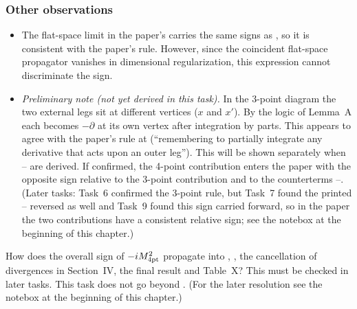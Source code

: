 \subsubsection{Other observations}
\begin{itemize}
\item The flat-space limit in the paper's  carries the same signs as , so
it is consistent with the paper's rule. However, since the coincident flat-space
propagator vanishes in dimensional regularization, this expression cannot discriminate
the sign.
\item \emph{Preliminary note (not yet derived in this task).} In the 3-point diagram the two
external legs sit at different vertices (\(x\) and \(x'\)). By the logic of Lemma~A each
becomes \(-\partial\) at its own vertex after integration by parts. This appears to agree
with the paper's rule at  (``remembering to partially integrate any derivative that
acts upon an outer leg''). This will be shown separately when -- are derived.
If confirmed, the 4-point contribution enters the paper with the opposite sign relative to
the 3-point contribution and to the counterterms --. (Later tasks: Task~6
confirmed the 3-point rule, but Task~7 found the printed -- reversed as well
and Task~9 found this sign carried forward, so in the paper the two contributions have a
consistent relative sign; see the notebox at the beginning of this chapter.)
\end{itemize}

\begin{notebox}
How does the overall sign of \(-iM^2_{\rm 4pt}\) propagate into , , the
cancellation of divergences in Section~IV, the final result  and Table~X?
This must be checked in later tasks. This task does not go beyond .
(For the later resolution see the notebox at the beginning of this chapter.)
\end{notebox}

